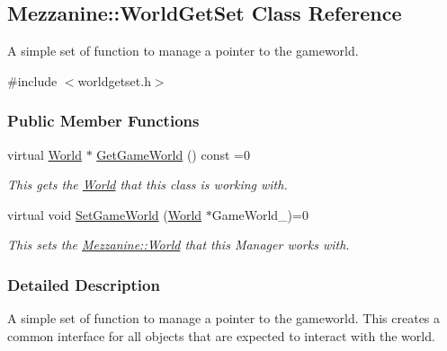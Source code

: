\hypertarget{classMezzanine_1_1WorldGetSet}{
\subsection{Mezzanine::WorldGetSet Class Reference}
\label{classMezzanine_1_1WorldGetSet}
}


A simple set of function to manage a pointer to the gameworld.  




{\ttfamily \#include $<$worldgetset.h$>$}

\subsubsection*{Public Member Functions}
\begin{DoxyCompactItemize}
\item 
virtual \hyperlink{classMezzanine_1_1World}{World} $\ast$ \hyperlink{classMezzanine_1_1WorldGetSet_ad79c6d3a9bff58ee8f243c637923af70}{GetGameWorld} () const =0
\begin{DoxyCompactList}\small\item\em This gets the \hyperlink{classMezzanine_1_1World}{World} that this class is working with. \item\end{DoxyCompactList}\item 
\hypertarget{classMezzanine_1_1WorldGetSet_ac98b926ddf8543f2d957203089c09b48}{
virtual void \hyperlink{classMezzanine_1_1WorldGetSet_ac98b926ddf8543f2d957203089c09b48}{SetGameWorld} (\hyperlink{classMezzanine_1_1World}{World} $\ast$GameWorld\_\-)=0}
\label{classMezzanine_1_1WorldGetSet_ac98b926ddf8543f2d957203089c09b48}

\begin{DoxyCompactList}\small\item\em This sets the \hyperlink{classMezzanine_1_1World}{Mezzanine::World} that this Manager works with. \item\end{DoxyCompactList}\end{DoxyCompactItemize}


\subsubsection{Detailed Description}
A simple set of function to manage a pointer to the gameworld. This creates a common interface for all objects that are expected to interact with the world. 

